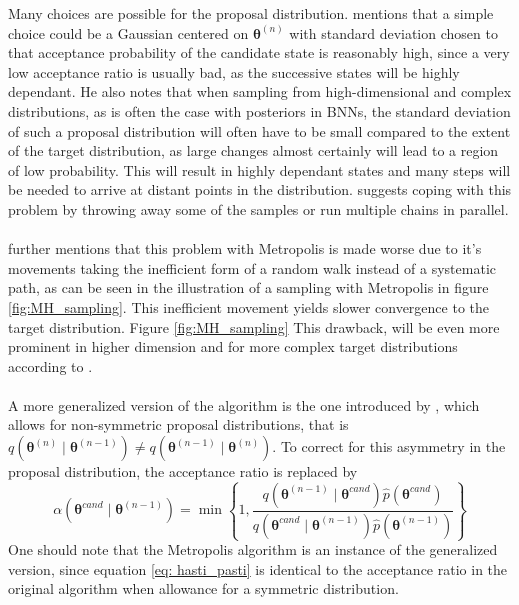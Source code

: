 Many choices are possible for the proposal distribution. \cite{neal2012bayesian} mentions that a simple choice could be a Gaussian centered on $\boldsymbol{\theta}^{(n)}$ with standard deviation chosen to that acceptance probability of the candidate state is reasonably high, since a very low acceptance ratio is usually bad, as the successive states will be highly dependant. He also notes that when sampling from high-dimensional and complex distributions, as is often the case with posteriors in BNNs, the standard deviation of such a proposal distribution will often have to be small compared to the extent of the target distribution, as large changes almost certainly will lead to a region of low probability. This will result in highly dependant states and many steps will be needed to arrive at distant points in the distribution. \cite{gelmanbda04} suggests coping with this problem by throwing away some of the samples or run multiple chains in parallel. \\
\\
\cite{neal2012bayesian} further mentions that this problem with Metropolis is made worse due to it's movements taking the inefficient form of a random walk instead of a systematic path, as can be seen in the illustration of a sampling with Metropolis in figure \ref{fig:MH_sampling}. This inefficient movement yields slower convergence to the target distribution. Figure \ref{fig:MH_sampling}  This drawback, will be even more prominent in higher dimension and for more complex target distributions according to \cite{gelmanbda04}. \\
\\
A more generalized version of the algorithm is the one introduced by \cite{hastings70}, which allows for non-symmetric proposal distributions, that is $q(\boldsymbol{\theta}^{(n)}\mid \boldsymbol{\theta}^{(n-1)}) \neq q(\boldsymbol{\theta}^{(n-1)}\mid \boldsymbol{\theta}^{(n)})$. To correct for this asymmetry in the proposal distribution, the acceptance ratio is replaced by
\begin{equation}\label{eq: hasti_pasti}
\alpha\left(\boldsymbol{\theta}^{c a n d} \mid \boldsymbol{\theta}^{(n-1)}\right)=\min \left\{1, \frac{q\left(\boldsymbol{\theta}^{(n-1)} \mid \boldsymbol{\theta}^{c a n d}\right) \hat{p}\left(\boldsymbol{\theta}^{c a n d}\right)}{q\left(\boldsymbol{\theta}^{c a n d} \mid \boldsymbol{\theta}^{(n-1)}\right) \hat{p}\left(\boldsymbol{\theta}^{(n-1)}\right)}\right\} 
\end{equation}
One should note that the Metropolis algorithm is an instance of the generalized version, since equation \ref{eq: hasti_pasti} is identical to the acceptance ratio in the original algorithm when allowance for a symmetric distribution. \\

